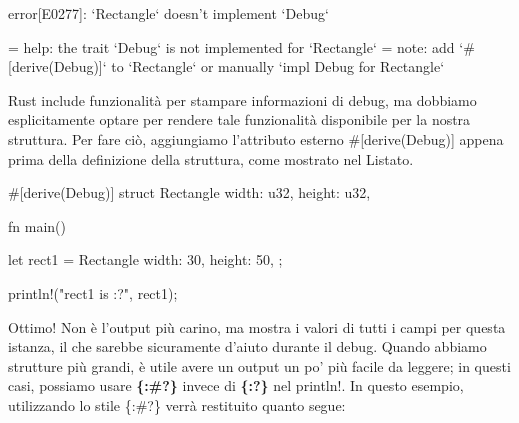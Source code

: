 \documentclass[11pt,a4paper]{article}
\begin{document}
\begin{rust}
error[E0277]: `Rectangle` doesn't implement `Debug`

   = help: the trait `Debug` is not implemented for `Rectangle`
   = note: add `#[derive(Debug)]` to `Rectangle` or manually 
   `impl Debug for Rectangle`
\end{rust}
Rust include funzionalità per stampare informazioni di debug, ma dobbiamo esplicitamente optare per rendere tale funzionalità disponibile per la nostra struttura. Per fare ciò, aggiungiamo l'attributo esterno \#[derive(Debug)] appena prima della definizione della struttura, come mostrato nel Listato.
\begin{rust}
#[derive(Debug)]
struct Rectangle {
    width: u32,
    height: u32,
}

fn main() {
    let rect1 = Rectangle {
        width: 30,
        height: 50,
    };

    println!("rect1 is {:?}", rect1);
}
\end{rust}
Ottimo! Non è l'output più carino, ma mostra i valori di tutti i campi per questa istanza, il che sarebbe sicuramente d'aiuto durante il debug. Quando abbiamo strutture più grandi, è utile avere un output un po' più facile da leggere; in questi casi, possiamo usare \textbf{\{:\#?\}} invece di \textbf{\{:?\}} nel println!. In questo esempio, utilizzando lo stile \{:\#?\} verrà restituito quanto segue:
\end{document}
